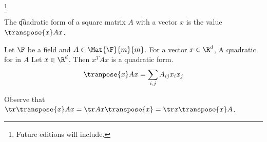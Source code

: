 
\footnote{Future editions will include.}


The \t{quadratic form} of a square matrix $A$ with a vector $x$ is the value $\transpose{x}Ax$.


Let $\F$ be a field and $A \in \Mat{\F}{m}{m}$.
For a vector $x \in \R^d$, A quadratic for in $A$
Let $x \in \R^d$.
Then $x^T A x$ is a quadratic form.
\[
  \tranpose{x} A x = \sum_{i,j} A_{ij}x_{i}x_{j}
\]


Observe that $\tr \transpose{x}Ax = \tr Ax\transpose{x} = \tr x\transpose{x}A$.

\blankpage
